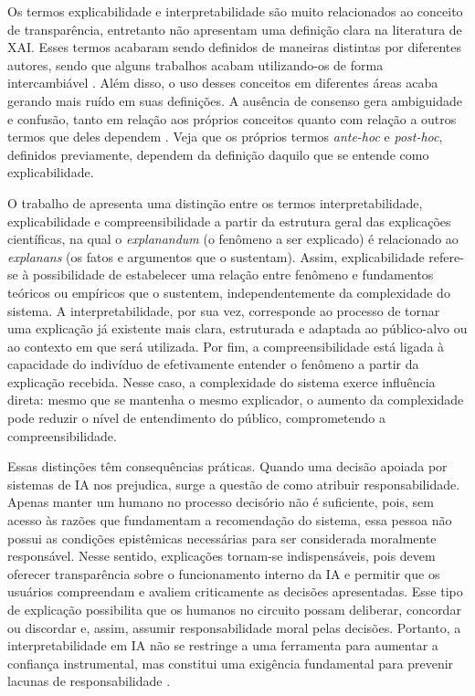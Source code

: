 Os termos explicabilidade e interpretabilidade são muito relacionados ao conceito de transparência, entretanto não apresentam uma definição clara na literatura de XAI. Esses termos acabaram sendo definidos de maneiras distintas por diferentes autores, sendo que alguns trabalhos acabam utilizando-os de forma intercambiável \citep{Mersha2024}. Além disso, o uso desses conceitos em diferentes áreas acaba gerando mais ruído em suas definições. A ausência de consenso gera ambiguidade e confusão, tanto em relação aos próprios conceitos quanto com relação a outros termos que deles dependem \citep{Erasmus2021}. Veja que os próprios termos \textit{ante-hoc} e \textit{post-hoc}, definidos previamente, dependem da definição daquilo que se entende como explicabilidade.

O trabalho de \cite{Erasmus2021} apresenta uma distinção entre os termos interpretabilidade, explicabilidade e compreensibilidade a partir da estrutura geral das explicações científicas, na qual o \textit{explanandum} (o fenômeno a ser explicado) é relacionado ao \textit{explanans} (os fatos e argumentos que o sustentam). Assim, explicabilidade refere-se à possibilidade de estabelecer uma relação entre fenômeno e fundamentos teóricos ou empíricos que o sustentem, independentemente da complexidade do sistema. A interpretabilidade, por sua vez, corresponde ao processo de tornar uma explicação já existente mais clara, estruturada e adaptada ao público-alvo ou ao contexto em que será utilizada. Por fim, a compreensibilidade está ligada à capacidade do indivíduo de efetivamente entender o fenômeno a partir da explicação recebida. Nesse caso, a complexidade do sistema exerce influência direta: mesmo que se mantenha o mesmo explicador, o aumento da complexidade pode reduzir o nível de entendimento do público, comprometendo a compreensibilidade.

Essas distinções têm consequências práticas. Quando uma decisão apoiada por sistemas de IA nos prejudica, surge a questão de como atribuir responsabilidade. Apenas manter um humano no processo decisório não é suficiente, pois, sem acesso às razões que fundamentam a recomendação do sistema, essa pessoa não possui as condições epistêmicas necessárias para ser considerada moralmente responsável. Nesse sentido, explicações tornam-se indispensáveis, pois devem oferecer transparência sobre o funcionamento interno da IA e permitir que os usuários compreendam e avaliem criticamente as decisões apresentadas. Esse tipo de explicação possibilita que os humanos no circuito possam deliberar, concordar ou discordar e, assim, assumir responsabilidade moral pelas decisões. Portanto, a interpretabilidade em IA não se restringe a uma ferramenta para aumentar a confiança instrumental, mas constitui uma exigência fundamental para prevenir lacunas de responsabilidade \citep{Baum2022}.

